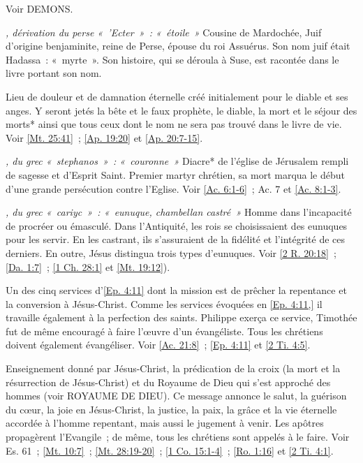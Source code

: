 \begin{multicols}{2}
\textit{}\newline
Voir DEMONS.

\textit{, dérivation du perse «~'Ecter~»~: «~étoile~»}\newline
Cousine de Mardochée, Juif d'origine benjaminite, reine de Perse, épouse du roi Assuérus. Son nom juif était Hadassa~: «~myrte~». Son histoire, qui se déroula à Suse, est racontée dans le livre portant son nom.

\textit{}\newline
Lieu de douleur et de damnation éternelle créé initialement pour le diable et ses anges. Y seront jetés la bête et le faux prophète, le diable, la mort et le séjour des morts* ainsi que tous ceux dont le nom ne sera pas trouvé dans le livre de vie. Voir \vref{Mt. 25:41}~; \vref{Ap. 19:20} et \vref{Ap. 20:7-15}.

\textit{, du grec «~stephanos~»~: «~couronne~»}\newline
Diacre* de l'église de Jérusalem rempli de sagesse et d'Esprit Saint. Premier martyr chrétien, sa mort marqua le début d'une grande persécution contre l'Eglise. Voir \vref{Ac. 6:1-6}~; Ac. 7 et \vref{Ac. 8:1-3}.

\textit{, du grec «~cariyc~»~: «~eunuque, chambellan castré~»}\newline
Homme dans l'incapacité de procréer ou émasculé. Dans l'Antiquité, les rois se choisissaient des eunuques pour les servir. En les castrant, ils s'assuraient de la fidélité et l'intégrité de ces derniers. En outre, Jésus distingua trois types d'eunuques. Voir \vref{2 R. 20:18}~; \vref{Da. 1:7}~; \vref{1 Ch. 28:1} et \vref{Mt. 19:12}).

\textit{}\newline
Un des cinq services d'\vref{Ep. 4:11} dont la mission est de prêcher la repentance et la conversion à Jésus-Christ. Comme les services évoquées en \vref{Ep. 4:11,} il travaille également à la perfection des saints. Philippe exerça ce service, Timothée fut de même encouragé à faire l'œuvre d'un évangéliste. Tous les chrétiens doivent également évangéliser. Voir \vref{Ac. 21:8}~; \vref{Ep. 4:11} et \vref{2 Ti. 4:5}.

\textit{}\newline
Enseignement donné par Jésus-Christ, la prédication de la croix (la mort et la résurrection de Jésus-Christ) et du Royaume de Dieu qui s'est approché des hommes (voir ROYAUME DE DIEU). Ce message annonce le salut, la guérison du cœur, la joie en Jésus-Christ, la justice, la paix, la grâce et la vie éternelle accordée à l'homme repentant, mais aussi le jugement à venir. Les apôtres propagèrent l'Evangile~; de même, tous les chrétiens sont appelés à le faire. Voir Es. 61~; \vref{Mt. 10:7}~; \vref{Mt. 28:19-20}~; \vref{1 Co. 15:1-4}~; \vref{Ro. 1:16} et \vref{2 Ti. 4:1}.


\end{multicols}
